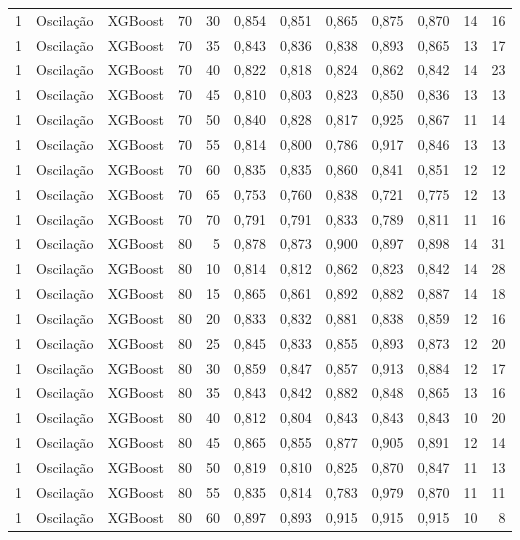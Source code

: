 \begin{longtable}{ccclrrrrrrrr}
1 & Oscilação & XGBoost & 70 & 30 & 0,854 & 0,851 & 0,865 & 0,875 & 0,870 & 14 & 16 \\
1 & Oscilação & XGBoost & 70 & 35 & 0,843 & 0,836 & 0,838 & 0,893 & 0,865 & 13 & 17 \\
1 & Oscilação & XGBoost & 70 & 40 & 0,822 & 0,818 & 0,824 & 0,862 & 0,842 & 14 & 23 \\
1 & Oscilação & XGBoost & 70 & 45 & 0,810 & 0,803 & 0,823 & 0,850 & 0,836 & 13 & 13 \\
1 & Oscilação & XGBoost & 70 & 50 & 0,840 & 0,828 & 0,817 & 0,925 & 0,867 & 11 & 14 \\
1 & Oscilação & XGBoost & 70 & 55 & 0,814 & 0,800 & 0,786 & 0,917 & 0,846 & 13 & 13 \\
1 & Oscilação & XGBoost & 70 & 60 & 0,835 & 0,835 & 0,860 & 0,841 & 0,851 & 12 & 12 \\
1 & Oscilação & XGBoost & 70 & 65 & 0,753 & 0,760 & 0,838 & 0,721 & 0,775 & 12 & 13 \\
1 & Oscilação & XGBoost & 70 & 70 & 0,791 & 0,791 & 0,833 & 0,789 & 0,811 & 11 & 16 \\
1 & Oscilação & XGBoost & 80 & 5 & 0,878 & 0,873 & 0,900 & 0,897 & 0,898 & 14 & 31 \\
1 & Oscilação & XGBoost & 80 & 10 & 0,814 & 0,812 & 0,862 & 0,823 & 0,842 & 14 & 28 \\
1 & Oscilação & XGBoost & 80 & 15 & 0,865 & 0,861 & 0,892 & 0,882 & 0,887 & 14 & 18 \\
1 & Oscilação & XGBoost & 80 & 20 & 0,833 & 0,832 & 0,881 & 0,838 & 0,859 & 12 & 16 \\
1 & Oscilação & XGBoost & 80 & 25 & 0,845 & 0,833 & 0,855 & 0,893 & 0,873 & 12 & 20 \\
1 & Oscilação & XGBoost & 80 & 30 & 0,859 & 0,847 & 0,857 & 0,913 & 0,884 & 12 & 17 \\
1 & Oscilação & XGBoost & 80 & 35 & 0,843 & 0,842 & 0,882 & 0,848 & 0,865 & 13 & 16 \\
1 & Oscilação & XGBoost & 80 & 40 & 0,812 & 0,804 & 0,843 & 0,843 & 0,843 & 10 & 20 \\
1 & Oscilação & XGBoost & 80 & 45 & 0,865 & 0,855 & 0,877 & 0,905 & 0,891 & 12 & 14 \\
1 & Oscilação & XGBoost & 80 & 50 & 0,819 & 0,810 & 0,825 & 0,870 & 0,847 & 11 & 13 \\
1 & Oscilação & XGBoost & 80 & 55 & 0,835 & 0,814 & 0,783 & 0,979 & 0,870 & 11 & 11 \\
1 & Oscilação & XGBoost & 80 & 60 & 0,897 & 0,893 & 0,915 & 0,915 & 0,915 & 10 & 8 \\

\end{longtable}
